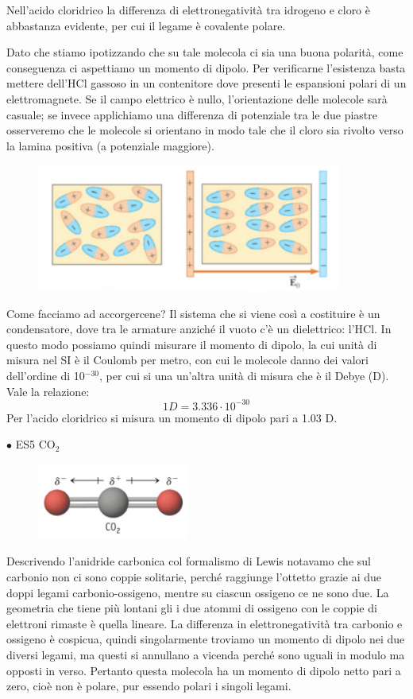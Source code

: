Nell'acido cloridrico la differenza di elettronegatività tra idrogeno e cloro è abbastanza evidente, per cui il legame è covalente polare.

Dato che stiamo ipotizzando che su tale molecola ci sia una buona polarità, come conseguenza ci aspettiamo un momento di dipolo.
Per verificarne l'esistenza basta mettere dell'HCl gassoso in un contenitore dove presenti le espansioni polari di un elettromagnete. Se il campo elettrico è nullo, l'orientazione delle molecole sarà casuale; se invece applichiamo una differenza di potenziale tra le due piastre osserveremo che le molecole si orientano in modo tale che il cloro sia rivolto verso la lamina positiva (a potenziale maggiore).
\begin{figure}[htp]
    \centering
    \includegraphics[width=10cm]{immagini/condensatore.png}
\end{figure}
Come facciamo ad accorgercene?
Il sistema che si viene così a costituire è un condensatore, dove tra le armature anziché il vuoto c'è un dielettrico: l'HCl. In questo modo possiamo quindi misurare il momento di dipolo, la cui unità di misura nel SI è il Coulomb per metro, con cui le molecole danno dei valori dell'ordine di 10$^{-30}$, per cui si una un'altra unità di misura che è il Debye (D). Vale la relazione:
$$1D=3.336\cdot10^{-30}$$
Per l'acido cloridrico si misura un momento di dipolo pari a 1.03 D.

$\bullet$ ES5 CO$_2$

\begin{figure}[htp]
    \centering
    \includegraphics[width=5cm]{immagini/CO_2.png}
\end{figure}

Descrivendo l'anidride carbonica col formalismo di Lewis notavamo che sul carbonio non ci sono coppie solitarie, perché raggiunge l'ottetto grazie ai due doppi legami carbonio-ossigeno, mentre su ciascun ossigeno ce ne sono due. La geometria che tiene più lontani gli i due atommi di ossigeno con le coppie di elettroni rimaste è quella lineare.
La differenza in elettronegatività tra carbonio e ossigeno è cospicua, quindi singolarmente troviamo un momento di dipolo nei due diversi legami, ma questi si annullano a vicenda perché sono uguali in modulo ma opposti in verso. Pertanto questa molecola ha un momento di dipolo netto pari a zero, cioè non è polare, pur essendo polari i singoli legami.

